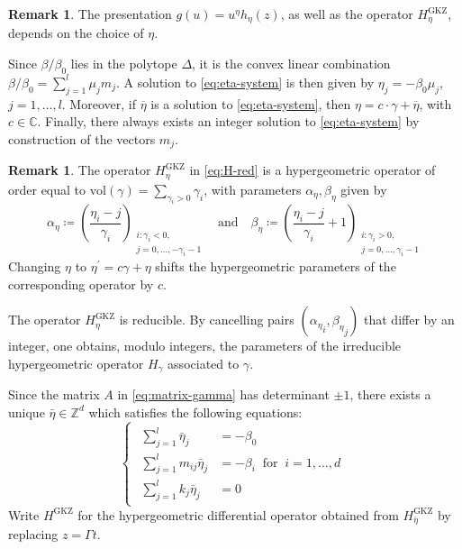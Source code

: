 \documentclass[11pt, reqno]{amsart}
\theoremstyle{plain}
\theoremstyle{definition}
\newtheorem{rem}[thm]{Remark}
\newcommand{\CC}{\mathbb{C}}
\newcommand{\Z}{\mathbb{Z}}
\begin{document}
\begin{rem}
\label{rem:eta}
The presentation $g(u)=u^\eta h_\eta(z)$, as well as the operator $H^{\mathrm{GKZ}}_\eta$,  depends on the choice of $\eta$. 

Since $\beta/\beta_0$ lies in the polytope $\Delta$, it is the convex linear combination $\beta/\beta_0=\sum_{j=1}^l \mu_j m_j$. 
A solution to \eqref{eq:eta-system} is then given by $\eta_j=-\beta_0 \mu_j$, $j=1, \dots, l$. 
Moreover, if $\overline{\eta}$ is a solution to \eqref{eq:eta-system}, then $\eta=c \cdot \gamma +\overline{\eta}$, with $c \in \CC$.
Finally, there always exists an integer solution to \eqref{eq:eta-system} 
by construction of the vectors $m_j$. 
\end{rem}
 
 \begin{rem}
\label{rem:H-GKZ}
 The operator ${H}^{\mathrm{GKZ}}_\eta$ in \eqref{eq:H-red} is a hypergeometric operator of order equal to $\mathrm{vol}(\gamma)=\sum_{\gamma_i>0} \gamma_i$,  with parameters $\alpha_\eta, \beta_\eta$ given by
 \begin{equation}
     \label{eq:alpha-beta-eta}
 \alpha_\eta \coloneqq \left(\frac{\eta_i -j}{\gamma_i}\right)_{
 \substack{ i \colon \gamma_i <0, \\ j=0, \dots, -\gamma_i-1} }
 \quad \text{and} \quad \beta_\eta \coloneqq 
\left(\frac{\eta_i -j}{\gamma_i}+1 \right)_{ 
\substack{ i \colon \gamma_i >0, \\ j=0, \dots, \gamma_i-1  }} 
\end{equation}
Changing $\eta$ to $\eta^\prime=c \gamma +\eta$ shifts the hypergeometric parameters of the corresponding operator by $c$.
 
The operator ${H}^{\mathrm{GKZ}}_\eta$ is reducible. 
By cancelling pairs $({\alpha_\eta}_i,{\beta_\eta}_j)$ that differ by an integer, one obtains, modulo integers, the parameters of the irreducible hypergeometric operator $H_\gamma$ associated to $\gamma$. 
\end{rem}






Since the matrix ${A}$ in \eqref{eq:matrix-gamma}  has determinant $\pm1$, 
there exists a unique $\bar{\eta} \in \Z^d$ which satisfies the following equations: 
\begin{equation}\label{eq:unique-eta}
\left\{ 
\begin{array}{l}
\begin{aligned}
\sum_{j=1}^l  \bar{\eta}_j  &= -\beta_0\\
\sum_{j=1}^l m_{ij} \bar{\eta}_j &= -\beta_i \ \text{ for } \  i=1,\dots,d\\
\sum_{j=1}^l k_j \bar{\eta}_j &= 0
\end{aligned}
\end{array} \right.
\end{equation}
Write $H^{\text{GKZ}}$ for the hypergeometric differential operator obtained from $H^{\text{GKZ}}_{\bar{\eta}}$ by replacing $z=\Gamma t$.
\end{document}

